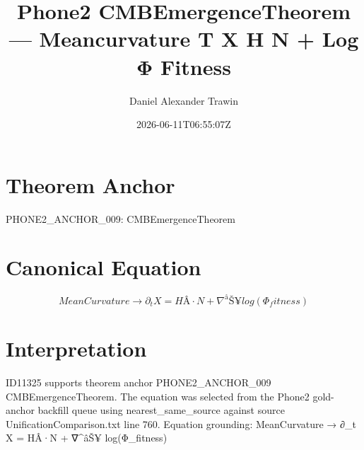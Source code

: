 \documentclass[11pt]{article}
\title{Phone2 CMBEmergenceTheorem — Meancurvature T X H N + Log Φ Fitness}
\author{Daniel Alexander Trawin}
\date{2026-06-11T06:55:07Z}
\begin{document}
\maketitle
\section*{Theorem Anchor}
PHONE2_ANCHOR_009: CMBEmergenceTheorem
\section*{Canonical Equation}
\[
MeanCurvature → ∂_t X = HÂ·N + ∇^âŠ¥ log(Φ_fitness)
\]
\section*{Interpretation}
ID11325 supports theorem anchor PHONE2_ANCHOR_009 CMBEmergenceTheorem. The equation was selected from the Phone2 gold-anchor backfill queue using nearest_same_source against source UnificationComparison.txt line 760. Equation grounding: MeanCurvature → ∂_t X = HÂ·N + ∇^âŠ¥ log(Φ_fitness)
\end{document}
